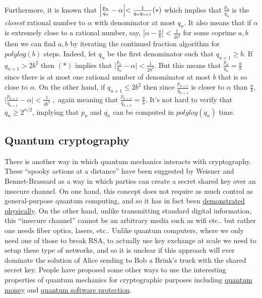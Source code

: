 Furthermore, it is known that
\(\Bigl|\tfrac{p_n}{q_n} - \alpha\Bigl| < \tfrac{1}{q_nq_{n+1}} (*)\)
which implies that \(\tfrac{p_n}{q_n}\) is the \emph{closest} rational
number to \(\alpha\) with denominator at most \(q_n\). It also means
that if \(\alpha\) is extremely close to a rational number, say,
\(\left|\alpha - \tfrac{a}{b} \right| < \tfrac{1}{4b^4}\) for some
coprime \(a,b\) then we can find \(a,b\) by iterating the continued
fraction algorithm for \(polylog(b)\) steps. Indeed, let \(q_n\) be the
first denominator such that \(q_{n+1} \geq b\). If \(q_{n+1} > 2b^2\)
then \((*)\) implies that
\(\bigl|\tfrac{p_n}{q_n}-\alpha\bigr| < \tfrac{1}{2b^2}\). But this
means that \(\tfrac{p_n}{q_n} = \tfrac{a}{b}\) since there is at most
one rational number of denominator at most \(b\) that is so close to
\(\alpha\). On the other hand, if \(q_{n+1} \leq 2b^2\) then since
\(\tfrac{p_{n+1}}{q_{n+1}}\) is closer to \(\alpha\) than
\(\tfrac{a}{b}\),
\(\bigl|\tfrac{p_{n+1}}{q_{n+1}}-\alpha\bigr| < \tfrac{1}{4b^4}\;,\)
again meaning that \(\tfrac{p_{n+1}}{q_{n+1}}=\tfrac{a}{b}\). It's not
hard to verify that \(q_n \geq 2^{n/2}\), implying that \(p_n\) and
\(q_n\) can be computed in \(polylog(q_n)\) time.

\subsection{Quantum cryptography}\label{21-Quantum-cryptography}

There is another way in which quantum mechanics interacts with
cryptography. These ``spooky actions at a distance'' have been suggested
by Weisner and Bennet-Brassard as a way in which parties can create a
secret shared key over an insecure channel. On one hand, this concept
does not require as much control as general-purpose quantum computing,
and so it has in fact been
\href{https://en.wikipedia.org/wiki/Quantum_key_distribution\#Quantum_Key_Distribution_Networks}{demonstrated
physically}. On the other hand, unlike transmitting standard digital
information, this ``insecure channel'' cannot be an arbitrary media such
as wifi etc.. but rather one needs fiber optics, lasers, etc.. Unlike
quantum computers, where we only need one of those to break RSA, to
actually use key exchange at scale we need to setup these type of
networks, and so it is unclear if this approach will ever dominate the
solution of Alice sending to Bob a Brink's truck with the shared secret
key. People have proposed some other ways to use the interesting
properties of quantum mechanics for cryptographic purposes including
\href{https://en.wikipedia.org/wiki/Quantum_money}{quantum money} and
\href{http://www.scottaaronson.com/papers/noclone-ccc.pdf}{quantum
software protection}.
